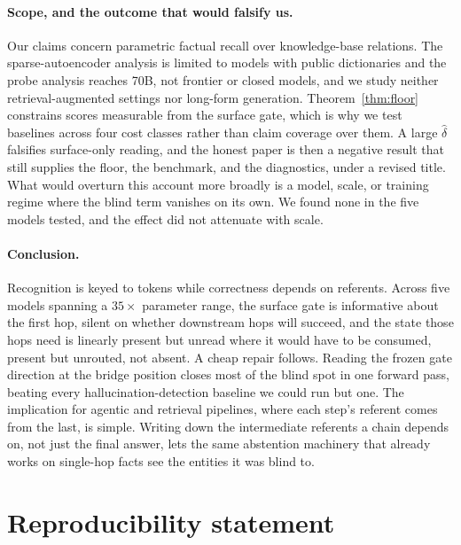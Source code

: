 \documentclass{article}
\begin{document}
\paragraph{Scope, and the outcome that would falsify us.} Our claims concern parametric factual recall
over knowledge-base relations. The sparse-autoencoder analysis is limited to models with public
dictionaries and the probe analysis reaches 70B, not frontier or closed models, and we study neither
retrieval-augmented settings nor long-form generation. Theorem~\ref{thm:floor} constrains scores
measurable from the surface gate, which is why we test baselines across four cost classes rather than
claim coverage over them. A large $\hat\delta$ falsifies surface-only reading, and the honest paper is then
a negative result that still supplies the floor, the benchmark, and the diagnostics, under a revised
title. What would overturn this account more broadly is a model, scale, or training regime where the
blind term vanishes on its own. We found none in the five models tested, and the effect did not
attenuate with scale.

\paragraph{Conclusion.} Recognition is keyed to tokens while correctness depends on referents. Across
five models spanning a $35\times$ parameter range, the surface gate is informative about the first
hop, silent on whether downstream hops will succeed, and the state those hops need is linearly present
but unread where it would have to be consumed, present but unrouted, not absent. A cheap repair
follows. Reading the frozen gate direction at the bridge position closes most of the blind spot in one
forward pass, beating every hallucination-detection baseline we could run but one. The implication for
agentic and retrieval pipelines, where each step's referent comes from the last, is simple. Writing
down the intermediate referents a chain depends on, not just the final answer, lets the same
abstention machinery that already works on single-hop facts see the entities it was blind to.
\section*{Reproducibility statement}
\end{document}
